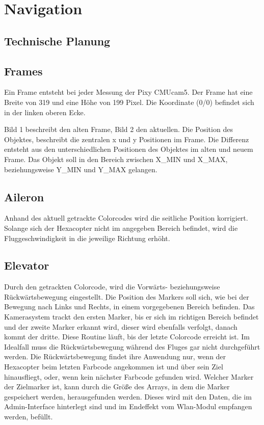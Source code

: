 \section{Navigation}

  \subsection{Technische Planung}

    \subsection*{Frames}
    Ein Frame entsteht bei jeder Messung der Pixy CMUcam5. Der Frame hat eine Breite von 319 und eine Höhe von 199 Pixel. Die Koordinate (0/0) befindet sich in der linken oberen Ecke.

    Bild 1 beschreibt den alten Frame, Bild 2 den aktuellen. Die Position des Objektes, beschreibt die zentralen x und y Positionen im Frame. Die Differenz entsteht aus den unterschiedlichen Positionen des Objektes im alten und neuem Frame. Das Objekt soll in den Bereich zwischen X\_MIN und X\_MAX, beziehungsweise Y\_MIN und Y\_MAX gelangen.


    \subsection*{Aileron}
    Anhand des aktuell getrackte Colorcodes wird die seitliche Position korrigiert. Solange sich der Hexacopter nicht im angegeben Bereich befindet, wird die Fluggeschwindigkeit in die jeweilige Richtung erhöht.

    \subsection*{Elevator}
    Durch den getrackten Colorcode, wird die Vorwärts- beziehungsweise Rückwärtsbewegung eingestellt. Die Position des Markers soll sich, wie bei der Bewegung nach Links und Rechts, in einem vorgegebenen Bereich befinden. 
    Das Kamerasystem trackt den ersten Marker, bis er sich im richtigen Bereich befindet und der zweite Marker erkannt wird, dieser wird ebenfalls verfolgt, danach kommt der dritte. Diese Routine läuft, bis der letzte Colorcode erreicht ist. Im Idealfall muss die Rückwärtsbewegung während des Fluges gar nicht durchgeführt werden. Die Rückwärtsbewegung findet ihre Anwendung nur, wenn der Hexacopter beim letzten Farbcode angekommen ist und über sein Ziel hinausfliegt, oder, wenn kein nächster Farbcode gefunden wird. Welcher Marker der Zielmarker ist, kann durch die Größe des Arrays, in dem die Marker gespeichert werden, herausgefunden werden. Dieses wird mit den Daten, die im Admin-Interface hinterlegt sind und im Endeffekt vom Wlan-Modul empfangen werden, befüllt.

